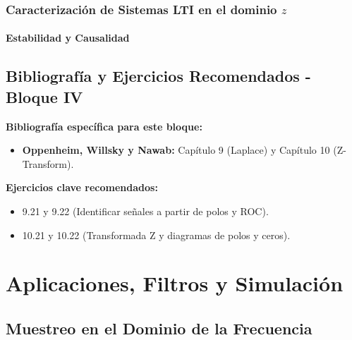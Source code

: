 \documentclass[11pt,a4paper,openany]{book}
\begin{document}
\section{Caracterización de Sistemas LTI en el dominio $z$}

\subsection{Estabilidad y Causalidad}



\cleardoublepage
{}
{}
\chapter*{Bibliografía y Ejercicios Recomendados - Bloque IV}

\textbf{Bibliografía específica para este bloque:}
\begin{itemize}
	\item \textbf{Oppenheim, Willsky y Nawab:} Capítulo 9 (Laplace) y Capítulo 10 (Z-Transform).
\end{itemize}

\textbf{Ejercicios clave recomendados:}
\begin{itemize}
	\item 9.21 y 9.22 (Identificar señales a partir de polos y ROC).
	\item 10.21 y 10.22 (Transformada Z y diagramas de polos y ceros).
\end{itemize}


\part{Aplicaciones, Filtros y Simulación}


\chapter{Muestreo en el Dominio de la Frecuencia}
\end{document}
